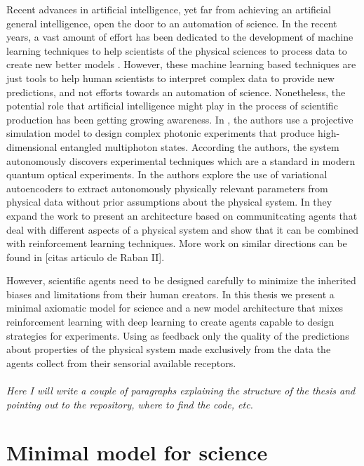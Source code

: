 \documentclass[11pt,a4paper,twoside]{report}
\newcommand{\+}{\textnormal{+} }
\theoremstyle{definition}
\numberwithin{equation}{chapter}
\begin{document}
Recent advances in artificial intelligence, yet far from achieving an artificial
general intelligence, open the door to an automation of science. In the recent
years, a vast amount of effort has been dedicated to the development of machine
learning techniques to help scientists of the physical sciences to process data
to create new better models \cite{Carleo_2019}. However, these machine learning
based techniques are just tools to help human scientists to interpret complex
data to provide new predictions, and not efforts towards an automation of
science. Nonetheless, the potential role that artificial intelligence might play
in the process of scientific production has been getting growing awareness. In
\cite{Melnikov_2018}, the authors use a projective simulation model to design
complex photonic experiments that produce high-dimensional entangled multiphoton
states. According the authors, the system autonomously discovers experimental
techniques which are a standard in modern quantum optical experiments. In
\cite{iten2020discovering} the authors explore the use of variational
autoencoders to extract autonomously physically relevant parameters from
physical data without prior assumptions about the physical system. In
\cite{nautrup2020operationally} they expand the work to present an architecture
based on communitcating agents that deal with different aspects of a physical
system and show that it can be combined with reinforcement learning techniques.
More work on similar directions can be found in [citas articulo de Raban II].
\par
However, scientific agents need to be designed carefully to minimize the
inherited biases and limitations from their human creators. In this thesis we
present a minimal axiomatic model for science and a new model architecture that
mixes reinforcement learning with deep learning to create agents capable to
design strategies for experiments. Using as feedback only the quality of the
predictions about properties of the physical system made exclusively from the
data the agents collect from their sensorial available receptors. 
\\
\\
\textit{Here I will write a couple of paragraphs explaining the structure of the 
thesis and pointing out to the repository, where to find the code, etc.}

\vspace{12mm}


\chapter{Minimal model for science} \label{science}
\end{document}
